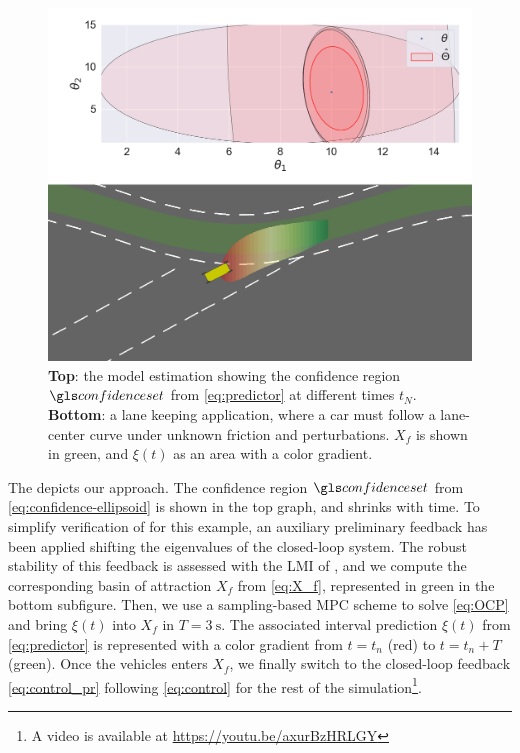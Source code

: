 \begin{figure}[th]
	\centering
	\includegraphics[width=0.9\linewidth]{img/lane-keeping.png}
	\caption{\textbf{Top}: the model estimation showing the confidence region $\confidenceset$ from \eqref{eq:predictor} at different times $t_N$. \textbf{Bottom}: a lane keeping application, where a car must follow a lane-center curve under unknown friction and perturbations. $X_f$ is shown in green, and $\xi(t)$ as an area with a color gradient.}
	\label{fig:lane-keeping}
\end{figure}

The  depicts our approach. The confidence region $\confidenceset$ from \eqref{eq:confidence-ellipsoid} is shown in the top graph, and shrinks with time. To simplify verification of  for this example, an auxiliary preliminary feedback has been applied shifting the eigenvalues of the closed-loop system. The robust stability of this feedback is assessed with the LMI of , and we compute the corresponding basin of attraction $X_f$ from \eqref{eq:X_f}, represented in green in the bottom subfigure. Then, we use a sampling-based \gls{MPC} scheme \citep{HomemDeMello2014} to solve \eqref{eq:OCP} and bring $\xi(t)$ into $X_f$ in $T=\SI{3}{\second}$.  The associated interval prediction $\xi(t)$ from \eqref{eq:predictor} is represented with a color gradient from $t=t_n$ (red) to $t=t_n+T$ (green). Once the vehicles enters $X_f$, we finally switch to the closed-loop feedback \eqref{eq:control_pr} following \eqref{eq:control} for the rest of the simulation\footnote{A video is available at \href{https://youtu.be/axurBzHRLGY}{https://youtu.be/axurBzHRLGY}}.


